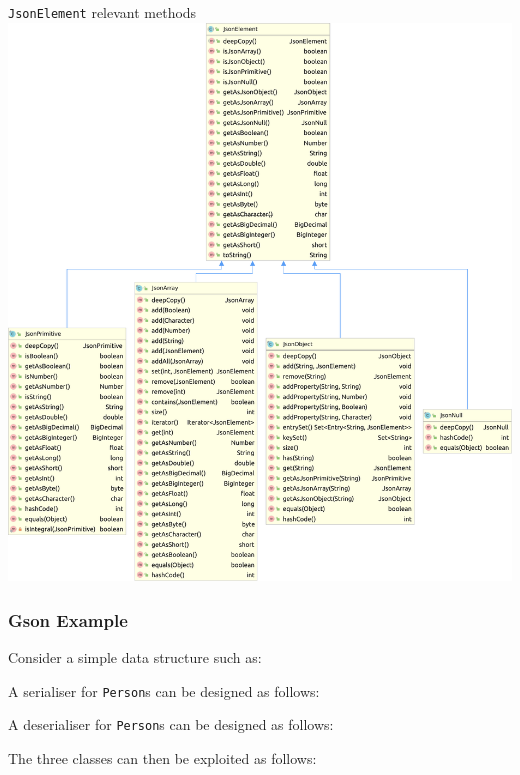 \documentclass{beamer}\mode<presentation>{\usetheme{AMSBolognaFC}}
\begin{document}
\begin{frame}[allowframebreaks]
    \begin{exampleblock}{\texttt{JsonElement} relevant methods}
        \centering
        \includegraphics[height=.7\textheight]{./img/JsonElement.pdf}
    \end{exampleblock}

\end{frame}

\begin{frame}[allowframebreaks]
    \frametitle{Gson Example}

    Consider a simple data structure such as:
    

    \framebreak

    A serialiser for \texttt{Person}s can be designed as follows:
    

    \framebreak

    A deserialiser for \texttt{Person}s can be designed as follows:
    

    \framebreak

    The three classes can then be exploited as follows:
    

\end{frame}
\end{document}
